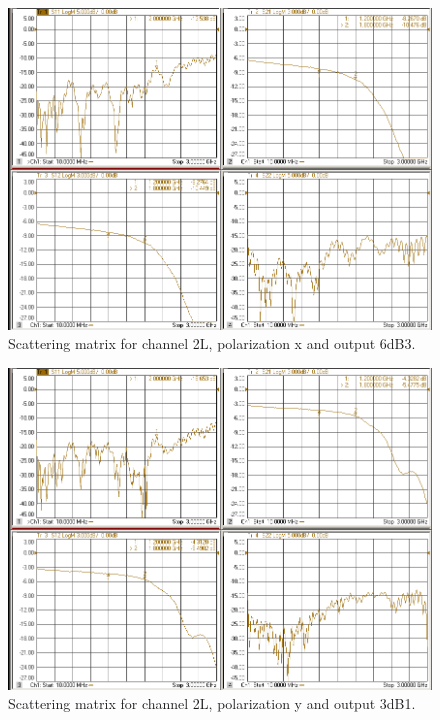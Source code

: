 \documentclass[12pt,a4paper,oneside]{article}
\begin{document}
\begin{figure}[H]
\centering
\includegraphics[width=0.9\linewidth]{VNA_results/2Lx_6dB3.png}
\caption{Scattering matrix for channel 2L, polarization x and output 6dB3.}
\label{fig:2Lx_6dB3}
\end{figure}


\begin{figure}[H]
\centering
\includegraphics[width=0.9\linewidth]{VNA_results/2Ly_3dB1.png}
\caption{Scattering matrix for channel 2L, polarization y and output 3dB1.}
\label{fig:2Ly_3dB1}
\end{figure}
\end{document}
